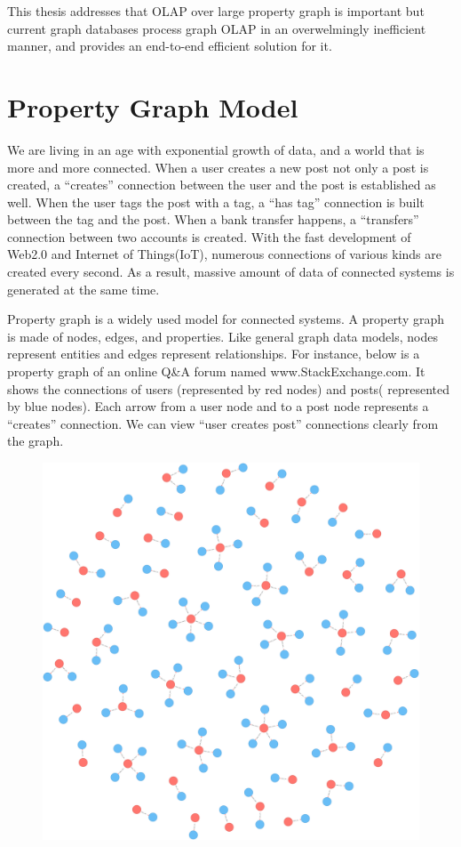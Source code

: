 
This thesis addresses that OLAP over large property graph is important but current graph databases process graph OLAP in an overwelmingly inefficient manner, and provides an end-to-end efficient solution for it.

\section{Property Graph Model}

We are living in an age with exponential growth of data, and a world that is more and more connected. When a user creates a new post not only a post is created,  a “creates” connection between the user and the post is established as well. When the user tags the post with a tag, a “has tag” connection is built between the tag and the post. When a bank transfer happens, a “transfers” connection between two accounts is created. With the fast development of Web2.0 and Internet of Things(IoT), numerous connections of various kinds are created every second. As a result, massive amount of data of connected systems is generated at the same time. 

Property graph is a widely used model for connected systems. A property graph is made of nodes, edges, and properties. Like general graph data models, nodes represent entities and edges represent relationships. For instance, below is a property graph of an online Q\&A forum named www.StackExchange.com. It shows the connections of users (represented by red nodes) and posts( represented by blue nodes). Each arrow from a user node and to a post node represents a “creates” connection. We can view “user creates post” connections clearly from the graph.


\begin {figure}[H]
\centering
\includegraphics[scale=0.07]{pic/1.png}
\end{figure}


